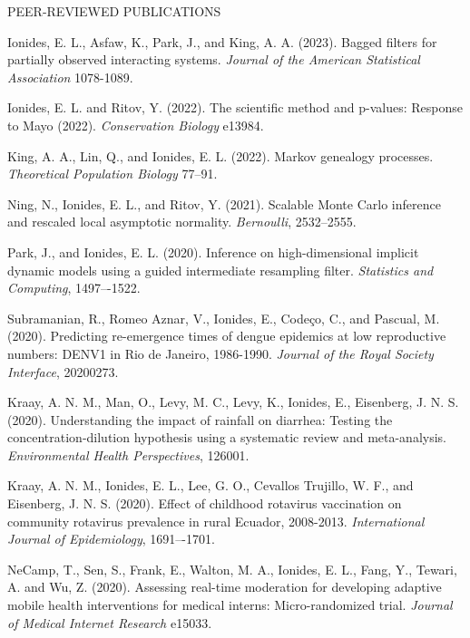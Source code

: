 \begin{reflist}{PEER-REVIEWED PUBLICATIONS}
    \item  Ionides, E. L., Asfaw, K., Park, J., and King, A. A. (2023). Bagged filters for partially observed interacting systems. {\em Journal of the American Statistical Association} {}{\separator}1078-1089. 


\item Ionides, E. L. and Ritov, Y. (2022). The scientific method and p-values: Response to Mayo (2022). {\em Conservation Biology} {}{\separator}e13984.

\item  King, A. A., Lin, Q., and Ionides, E. L. (2022). Markov genealogy processes. {\em Theoretical Population Biology} {}{\separator}77--91.
  
\item Ning, N., Ionides, E. L., and Ritov, Y. (2021). Scalable Monte Carlo inference and rescaled local asymptotic normality. {\em Bernoulli}, {}{\separator}2532--2555.
  
  \item Park, J., and Ionides, E. L. (2020). Inference on high-dimensional implicit dynamic models using a guided intermediate resampling filter. {\em Statistics and Computing}, {}{\separator}1497–-1522.

\item Subramanian, R., Romeo Aznar, V., Ionides, E., Code{\c c}o, C., and Pascual, M. (2020). Predicting re-emergence times of dengue epidemics at low reproductive numbers: DENV1 in Rio de Janeiro, 1986-1990. {\em Journal of the Royal Society Interface}, {}{\separator}20200273. 

\item Kraay, A. N. M., Man, O., Levy, M. C., Levy, K., Ionides, E., Eisenberg, J. N. S. (2020). Understanding the impact of rainfall on diarrhea: Testing the concentration-dilution hypothesis using a systematic review and meta-analysis. {\em Environmental Health Perspectives}, {}{\separator}126001.
  
\item Kraay, A. N. M., Ionides, E. L., Lee, G. O., Cevallos Trujillo, W. F., and Eisenberg, J. N. S. (2020). Effect of childhood rotavirus vaccination on community rotavirus prevalence in rural Ecuador, 2008-2013. {\em International Journal of Epidemiology}, {}{\separator}1691–-1701.
  
\item NeCamp, T., Sen, S., Frank, E., Walton, M. A., Ionides, E. L., Fang, Y., Tewari, A. and Wu, Z. (2020). Assessing real-time moderation for developing adaptive mobile health interventions for medical interns: Micro-randomized trial.
  {\it Journal of Medical Internet Research} {}{\separator}e15033.
  

\end{reflist}
